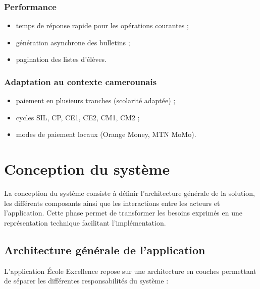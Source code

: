 \documentclass[12pt, a4paper]{report}
\begin{document}
\subsection{Performance}
\begin{itemize}[noitemsep]
    \item temps de réponse rapide pour les opérations courantes ;
    \item génération asynchrone des bulletins ;
    \item pagination des listes d'élèves.
\end{itemize}

\subsection{Adaptation au contexte camerounais}
\begin{itemize}[noitemsep]
    \item paiement en plusieurs tranches (scolarité adaptée) ;
    \item cycles SIL, CP, CE1, CE2, CM1, CM2 ;
    \item modes de paiement locaux (Orange Money, MTN MoMo).
\end{itemize}

\chapter{Conception du système}

La conception du système consiste à définir l'architecture générale de la solution, les différents composants ainsi que les interactions entre les acteurs et l'application. Cette phase permet de transformer les besoins exprimés en une représentation technique facilitant l'implémentation.

\section{Architecture générale de l'application}
L'application École Excellence repose sur une architecture en couches permettant de séparer les différentes responsabilités du système :
\end{document}

